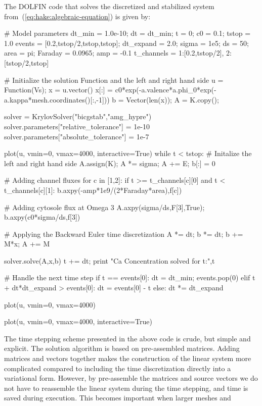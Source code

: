 The DOLFIN code that solves the discretized and stabilized system
from~(\ref{eq:hake:algebraic-equation}) is given by:
\begin{python}
# Model parameters
dt_min = 1.0e-10; dt = dt_min; t = 0; c0 = 0.1; tstop = 1.0
events = [0.2,tstop/2,tstop,tstop]; dt_expand = 2.0;
sigma = 1e5; ds = 50; area = pi; Faraday = 0.0965; amp = -0.1
t_channels = {1:[0.2,tstop/2], 2:[tstop/2,tstop]}

# Initialize the solution Function and the left and right hand side
u = Function(Vs); x = u.vector()
x[:] = c0*exp(-a.valence*a.phi_0*exp(-a.kappa*mesh.coordinates()[:,-1]))
b = Vector(len(x)); A = K.copy();

solver = KrylovSolver("bicgstab","amg_hypre")
solver.parameters["relative_tolerance"] = 1e-10
solver.parameters["absolute_tolerance"] = 1e-7

plot(u, vmin=0, vmax=4000, interactive=True)
while t < tstop:
    # Initalize the left and right hand side
    A.assign(K); A *= sigma; A += E; b[:] = 0

    # Adding channel fluxes
    for c in [1,2]:
        if t >= t_channels[c][0] and t < t_channels[c][1]:
            b.axpy(-amp*1e9/(2*Faraday*area),f[c])

    # Adding cytosole flux at Omega 3
    A.axpy(sigma/ds,F[3],True); b.axpy(c0*sigma/ds,f[3])

    # Applying the Backward Euler time discretization
    A *= dt; b *= dt; b += M*x; A += M

    solver.solve(A,x,b)
    t += dt; print "Ca Concentration solved for t:",t

    # Handle the next time step
    if t == events[0]:
        dt = dt_min; events.pop(0)
    elif t + dt*dt_expand > events[0]:
        dt = events[0] - t
    else:
        dt *= dt_expand

    plot(u, vmin=0, vmax=4000)

plot(u, vmin=0, vmax=4000, interactive=True)
\end{python}
The time stepping scheme presented in the above code is crude, but
simple and explicit. The solution algorithm is based on pre-assembled
matrices. Adding matrices and vectors together makes the construction
of the linear system more complicated compared to including the time
discretization directly into a variational form. However, by
pre-assemble the matrices and source vectors we do not have to
reassemble the linear system during the time stepping, and time is
saved during execution. This becomes important when larger meshes and
